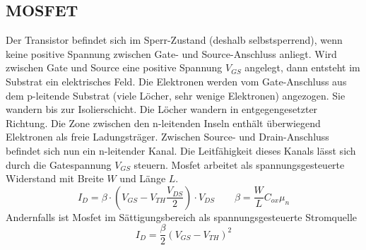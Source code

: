 \subsection{MOSFET}
Der Transistor befindet sich im Sperr-Zustand (deshalb selbstsperrend), wenn keine positive Spannung zwischen Gate- und Source-Anschluss anliegt. Wird zwischen Gate und Source eine positive Spannung $V_{GS}$ angelegt, dann entsteht im Substrat ein elektrisches Feld. Die Elektronen werden vom Gate-Anschluss aus dem p-leitende Substrat (viele Löcher, sehr wenige Elektronen) angezogen. Sie wandern bis zur Isolierschicht. Die Löcher wandern in entgegengesetzter Richtung. Die Zone zwischen den n-leitenden Inseln enthält überwiegend Elektronen als freie Ladungsträger. Zwischen Source- und Drain-Anschluss befindet sich nun ein n-leitender Kanal. Die Leitfähigkeit dieses Kanals lässt sich durch die Gatespannung $V_{GS}$ steuern.
Mosfet arbeitet als spannungsgesteuerte Widerstand mit Breite $W$ und Länge $L$.
\[
I_D = \beta \cdot \left(V_{GS} - V_{TH} \frac{V_{DS}}{2}\right)\cdot V_{DS} \qquad \beta = \frac{W}{L}C_{ox}\mu_n
\]
Andernfalls ist Mosfet im Sättigungsbereich als spannungsgesteuerte Stromquelle
\[
I_D = \frac{\beta}{2}\left(V_{GS} - V_{TH}\right)^2
\]